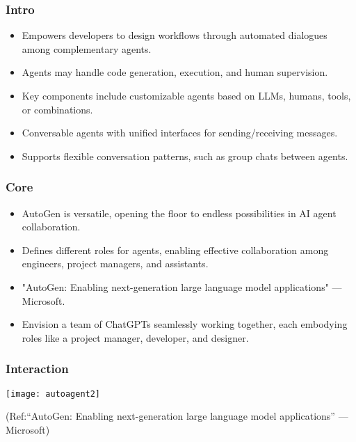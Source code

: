 \begin{frame}[fragile]\frametitle{Intro}
  \begin{itemize}
    \item Empowers developers to design workflows through automated dialogues among complementary agents.
    \item Agents may handle code generation, execution, and human supervision.
    \item Key components include customizable agents based on LLMs, humans, tools, or combinations.
    \item Conversable agents with unified interfaces for sending/receiving messages.
    \item Supports flexible conversation patterns, such as group chats between agents.
  \end{itemize}
\end{frame}

\begin{frame}[fragile]\frametitle{Core}
  \begin{itemize}
    \item AutoGen is versatile, opening the floor to endless possibilities in AI agent collaboration.
    \item Defines different roles for agents, enabling effective collaboration among engineers, project managers, and assistants.
    \item "AutoGen: Enabling next-generation large language model applications" — Microsoft.
    \item Envision a team of ChatGPTs seamlessly working together, each embodying roles like a project manager, developer, and designer.
  \end{itemize}
\end{frame}

\begin{frame}[fragile]\frametitle{Interaction}
	
	\begin{center}
	\texttt{[image: autoagent2]}
	\end{center}
	
{\tiny (Ref:“AutoGen: Enabling next-generation large language model applications” — Microsoft)}
\end{frame}


